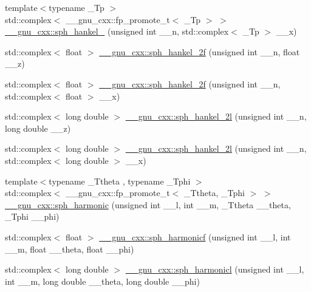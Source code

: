 \begin{DoxyCompactItemize}
\item 
{\footnotesize template$<$typename \+\_\+\+Tp $>$ }\\std\+::complex$<$ \+\_\+\+\_\+gnu\+\_\+cxx\+::fp\+\_\+promote\+\_\+t$<$ \+\_\+\+Tp $>$ $>$ \hyperlink{group__gnu__math__spec__func_ga0e7d9b5a93ab1d1040040f0ef44590de}{\+\_\+\+\_\+gnu\+\_\+cxx\+::sph\+\_\+hankel\+\_} (unsigned int \+\_\+\+\_\+n, std\+::complex$<$ \+\_\+\+Tp $>$ \+\_\+\+\_\+x)
\item 
std\+::complex$<$ float $>$ \hyperlink{group__gnu__math__spec__func_ga9496b81f94b8ba0162cf45df72be1e71}{\+\_\+\+\_\+gnu\+\_\+cxx\+::sph\+\_\+hankel\+\_\+2f} (unsigned int \+\_\+\+\_\+n, float \+\_\+\+\_\+z)
\item 
std\+::complex$<$ float $>$ \hyperlink{group__gnu__math__spec__func_ga4c3194b71831b265811f987cbbf6e031}{\+\_\+\+\_\+gnu\+\_\+cxx\+::sph\+\_\+hankel\+\_\+2f} (unsigned int \+\_\+\+\_\+n, std\+::complex$<$ float $>$ \+\_\+\+\_\+x)
\item 
std\+::complex$<$ long double $>$ \hyperlink{group__gnu__math__spec__func_ga6d3ead73a4f0bfeeb0aa1fd99daaf3b1}{\+\_\+\+\_\+gnu\+\_\+cxx\+::sph\+\_\+hankel\+\_\+2l} (unsigned int \+\_\+\+\_\+n, long double \+\_\+\+\_\+z)
\item 
std\+::complex$<$ long double $>$ \hyperlink{group__gnu__math__spec__func_ga3d9d9aaceba455a5ddc79d178ee1cb6d}{\+\_\+\+\_\+gnu\+\_\+cxx\+::sph\+\_\+hankel\+\_\+2l} (unsigned int \+\_\+\+\_\+n, std\+::complex$<$ long double $>$ \+\_\+\+\_\+x)
\item 
{\footnotesize template$<$typename \+\_\+\+Ttheta , typename \+\_\+\+Tphi $>$ }\\std\+::complex$<$ \+\_\+\+\_\+gnu\+\_\+cxx\+::fp\+\_\+promote\+\_\+t$<$ \+\_\+\+Ttheta, \+\_\+\+Tphi $>$ $>$ \hyperlink{group__gnu__math__spec__func_gacbff28988d5d36f0c3b3fe03d4f57896}{\+\_\+\+\_\+gnu\+\_\+cxx\+::sph\+\_\+harmonic} (unsigned int \+\_\+\+\_\+l, int \+\_\+\+\_\+m, \+\_\+\+Ttheta \+\_\+\+\_\+theta, \+\_\+\+Tphi \+\_\+\+\_\+phi)
\item 
std\+::complex$<$ float $>$ \hyperlink{group__gnu__math__spec__func_ga062b1156f5646fe42719439bb3dcc9e5}{\+\_\+\+\_\+gnu\+\_\+cxx\+::sph\+\_\+harmonicf} (unsigned int \+\_\+\+\_\+l, int \+\_\+\+\_\+m, float \+\_\+\+\_\+theta, float \+\_\+\+\_\+phi)
\item 
std\+::complex$<$ long double $>$ \hyperlink{group__gnu__math__spec__func_ga414c8374b4579aa14e38f5401304b6fa}{\+\_\+\+\_\+gnu\+\_\+cxx\+::sph\+\_\+harmonicl} (unsigned int \+\_\+\+\_\+l, int \+\_\+\+\_\+m, long double \+\_\+\+\_\+theta, long double \+\_\+\+\_\+phi)

\end{DoxyCompactItemize}
